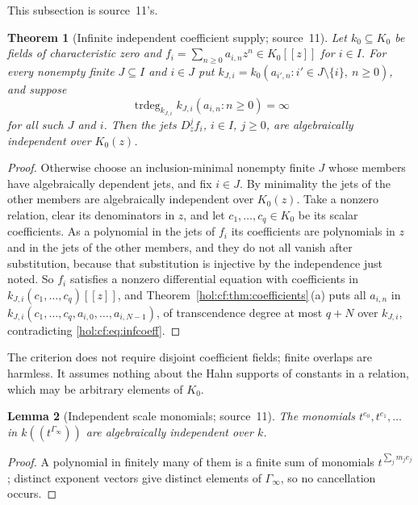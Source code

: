 \documentclass[11pt]{article}
\numberwithin{equation}{section}
\newtheorem{theorem}{Theorem}[section]
\newtheorem{lemma}[theorem]{Lemma}
\theoremstyle{definition}
\theoremstyle{remark}
\newcommand{\trdeg}{\operatorname{trdeg}}
\begin{document}
This subsection is source~11's.

\begin{theorem}[Infinite independent coefficient supply; source~11]
\label{hol:cf:thm:indcriterion}
Let $k_0\subseteq K_0$ be fields of characteristic zero and
$f_i=\sum_{n\ge0}a_{i,n}z^n\in K_0[[z]]$ for $i\in I$. For every nonempty
finite $J\subseteq I$ and $i\in J$ put
$k_{J,i}=k_0(a_{i',n}:i'\in J\setminus\{i\},\ n\ge0)$, and suppose
\begin{equation}\label{hol:cf:eq:infcoeff}
 \trdeg_{k_{J,i}}k_{J,i}(a_{i,n}:n\ge0)=\infty
\end{equation}
for all such $J$ and $i$. Then the jets $D_z^jf_i$, $i\in I$, $j\ge0$, are
algebraically independent over $K_0(z)$.
\end{theorem}

\begin{proof}
Otherwise choose an inclusion-minimal nonempty finite $J$ whose members have
algebraically dependent jets, and fix $i\in J$. By minimality the jets of the
other members are algebraically independent over $K_0(z)$. Take a nonzero
relation, clear its denominators in $z$, and let $c_1,\ldots,c_q\in K_0$ be its
scalar coefficients. As a polynomial in the jets of $f_i$ its coefficients
are polynomials in $z$ and in the jets of the other members, and they do not
all vanish after substitution, because that substitution is injective by
the independence just noted. So $f_i$ satisfies a nonzero differential
equation with coefficients in $k_{J,i}(c_1,\ldots,c_q)[[z]]$, and
Theorem~\ref{hol:cf:thm:coefficients}\,(a) puts all $a_{i,n}$ in
$k_{J,i}(c_1,\ldots,c_q,a_{i,0},\ldots,a_{i,N-1})$, of transcendence degree at
most $q+N$ over $k_{J,i}$, contradicting \eqref{hol:cf:eq:infcoeff}.
\end{proof}

The criterion does not require disjoint coefficient fields; finite overlaps
are harmless. It assumes nothing about the Hahn supports of constants in a
relation, which may be arbitrary elements of $K_0$.

\begin{lemma}[Independent scale monomials; source~11]
\label{hol:cf:lem:monomials}
The monomials $t^{e_0},t^{e_1},\ldots$ in $k((t^{\Gamma_\infty}))$ are
algebraically independent over $k$.
\end{lemma}

\begin{proof}
A polynomial in finitely many of them is a finite sum of monomials
$t^{\sum_jm_je_j}$; distinct exponent vectors give distinct elements of
$\Gamma_\infty$, so no cancellation occurs.
\end{proof}
\end{document}
